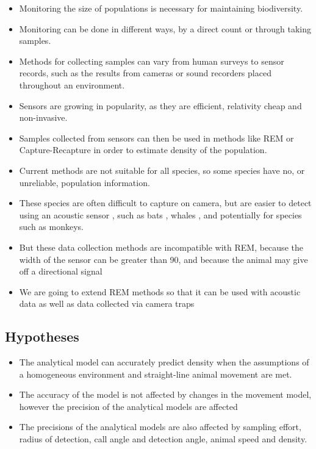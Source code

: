 \documentclass[a4paper,10pt,reqno,oneside]{amsart}
\begin{document}
\begin{itemize}
\item Monitoring the size of populations is necessary for maintaining biodiversity.
\item Monitoring can be done in different ways, by a direct count or through taking samples. \citep{pollock2002large}
\item Methods for collecting samples can vary from human surveys to sensor records, such as the results from cameras or sound recorders placed throughout an environment. 
\item Sensors are growing in popularity, as they are efficient, relativity cheap and non-invasive. \citep{gese2001monitoring}
\item Samples collected from sensors can then be used in methods like REM or Capture-Recapture in order to estimate density of the population.
\item Current methods are not suitable for all species, so some species have no, or unreliable, population information. 
\item These species are often difficult to capture on camera, but are easier to detect using an acoustic sensor \citep{rogers2013density}, such as bats \citep{ofarrel1999comparison}, whales \citep{mcdonald1999passive}, and potentially for species such as monkeys. 
\item But these data collection methods are incompatible with REM, because the width of the sensor can be greater than 90, and because the animal may give off a directional signal 
\item We are going to extend REM methods so that it can be used with acoustic data as well as data collected via camera traps
\end{itemize}

\subsection{Hypotheses}

\begin{itemize}
\item The analytical model can accurately predict density when the assumptions of a homogeneous environment and straight-line animal movement are met.
\item The accuracy of the model is not affected by changes in the movement model, however the precision of the analytical models are affected
\item The precisions of the analytical models are also affected by sampling effort, radius of detection, call angle and detection angle, animal speed and density.
\end{itemize}
\end{document}
